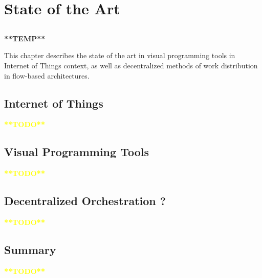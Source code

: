 \chapter{State of the Art}\label{chap:sota}

\section*{}


\textbf{**TEMP**}


This chapter describes the state of the art in visual programming tools in Internet of Things context, as well as decentralized methods of work distribution in flow-based architectures. 

\section{Internet of Things}

\textcolor{yellow}{\textbf{**TODO**}}

\section{Visual Programming Tools}

\textcolor{yellow}{\textbf{**TODO**}}

\section{Decentralized Orchestration ?}

\textcolor{yellow}{\textbf{**TODO**}}

\section{Summary}

\textcolor{yellow}{\textbf{**TODO**}}

